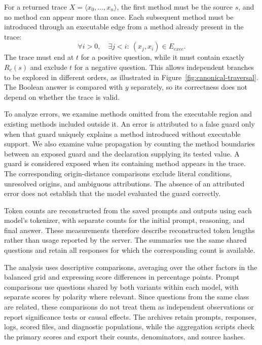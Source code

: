 For a returned trace $X=\langle x_0,\ldots,x_n\rangle$, the first method must be the source $s$, and no method can appear more than once. Each subsequent method must be introduced through an executable edge from a method already present in the trace:
\[
    \forall i>0,\quad \exists j<i:\ (x_j,x_i)\in E_{\mathit{exec}}.
\]
The trace must end at $t$ for a positive question, while it must contain exactly $R_e(s)$ and exclude $t$ for a negative question. This allows independent branches to be explored in different orders, as illustrated in Figure~\ref{fig:canonical-traversal}. The Boolean answer is compared with $y$ separately, so its correctness does not depend on whether the trace is valid.



To analyze errors, we examine methods omitted from the executable region and existing methods included outside it. An error is attributed to a false guard only when that guard uniquely explains a method introduced without executable support. We also examine value propagation by counting the method boundaries between an exposed guard and the declaration supplying its tested value. A guard is considered exposed when its containing method appears in the trace. The corresponding origin-distance comparisons exclude literal conditions, unresolved origins, and ambiguous attributions. The absence of an attributed error does not establish that the model evaluated the guard correctly.

Token counts are reconstructed from the saved prompts and outputs using each model's tokenizer, with separate counts for the initial prompt, reasoning, and final answer. These measurements therefore describe reconstructed token lengths rather than usage reported by the server. The summaries use the same shared questions and retain all responses for which the corresponding count is available.

The analysis uses descriptive comparisons, averaging over the other factors in the balanced grid and expressing score differences in percentage points. Prompt comparisons use questions shared by both variants within each model, with separate scores by polarity where relevant. Since questions from the same class are related, these comparisons do not treat them as independent observations or report significance tests or causal effects. The archives retain prompts, responses, logs, scored files, and diagnostic populations, while the aggregation scripts check the primary scores and export their counts, denominators, and source hashes.

